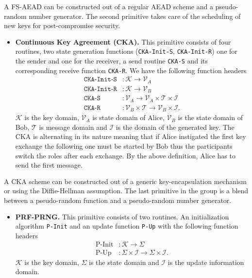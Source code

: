 \documentclass[11pt,a4paper,twoside,openright,bibliography=totoc]{scrbook}
\renewcommand{\t}{\text} %
\begin{document}
A FS-AEAD can be constructed out of a regular AEAD scheme and a pseudo-random
number generator. The second primitive takes care of the scheduling
of new keys for post-compromise security.
\begin{itemize}
\item \textbf{Continuous Key Agreement (CKA).} This primitive consists
  of four routines, two state generation functions (\texttt{CKA-Init-S}, \texttt{CKA-Init-R})
  one for the sender and one for the receiver, a send routine \texttt{CKA-S} and
  its corresponding receive function \texttt{CKA-R}. We have the following
  function headers
  \begin{align*}
    \texttt{CKA-Init-S} & : \mathcal{K} \rightarrow \mathcal{V}_A \\
    \texttt{CKA-Init-R} & : \mathcal{K} \rightarrow \mathcal{V}_B \\
    \texttt{CKA-S} & : \mathcal{V}_A \rightarrow
                \mathcal{V}_A \times \mathcal{T} \times \mathcal{I} \\
    \texttt{CKA-R} & : \mathcal{V}_B \times \mathcal{T} \rightarrow
                \mathcal{V}_B \times \mathcal{I}.
  \end{align*}
  $\mathcal{K}$ is the key domain, $\mathcal{V}_A$ is state domain of Alice,
  $\mathcal{V}_B$ is the state domain of Bob, $\mathcal{T}$
  is message domain and $\mathcal{I}$ is the domain of the generated key.
  The CKA is alternating in its nature meaning that if Alice instigated
  the first key exchange the following one must be started by Bob thus
  the participants switch the roles after each exchange. By the
  above definition, Alice has to send the first message.
\end{itemize}

A CKA scheme can be constructed out of a generic key-encapsulation
mechanism or using the Diffie-Hellman assumption. The last
primitive in the group is a blend between a pseudo-random function
and a pseudo-random number generator.
\begin{itemize}
\item \textbf{PRF-PRNG.} This primitive consists of two routines.
  An initialization algorithm \texttt{P-Init} and an update function \texttt{P-Up}
  with the following function headers
  \begin{align*}
    \t{P-Init} & : \mathcal{K} \rightarrow \Sigma \\
    \t{P-Up} & : \Sigma \times \mathcal{I} \rightarrow \Sigma \times \mathcal{I}.
  \end{align*}
  $\mathcal{K}$ is the key domain, $\Sigma$ is the state domain and
  $\mathcal{I}$ is the update information domain.
\end{itemize}
\end{document}
